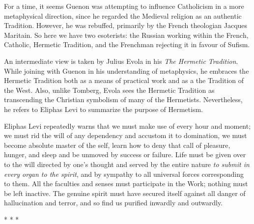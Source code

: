 For a time, it seems Guenon was attempting to influence Catholicism in a more metaphysical direction, since he regarded the Medieval religion as an authentic Tradition. However, he was rebuffed, primarily by the French theologian Jacques Maritain. So here we have two esoterists: the Russian working within the French, Catholic, Hermetic Tradition, and the Frenchman rejecting it in favour of Sufism.

An intermediate view is taken by Julius Evola in his \emph{The Hermetic Tradition}. While joining with Guenon in his understanding of metaphysics, he embraces the Hermetic Tradition both as a means of practical work and as a the Tradition of the West. Also, unlike Tomberg, Evola sees the Hermetic Tradition as transcending the Christian symbolism of many of the Hermetists. Nevertheless, he refers to Eliphas Levi to summarize the purpose of Hermetism.

\begin{quotex}
Eliphas Levi repeatedly warns that we must make use of every hour and moment; we must rid the will of any dependency and accustom it to domination, we must become absolute master of the self, learn how to deny that call of pleasure, hunger, and sleep and be unmoved by success or failure. Life must be given over to the will directed by one's thought and served by the entire nature \emph{to submit in every organ to the spirit}, and by sympathy to all universal forces corresponding to them. All the faculties and senses must participate in the Work; nothing must be left inactive. The genuine spirit must have secured itself against all danger of hallucination and terror, and so find us purified inwardly and outwardly.
\end{quotex}




\begin{center}* * *\end{center}

